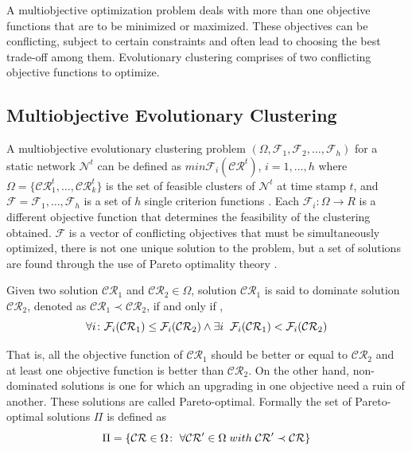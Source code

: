 \documentclass[12pt]{arsubmit}
\begin{document}
A multiobjective optimization problem deals with more than one objective functions that are to be minimized or maximized. These objectives can be conflicting, subject to certain constraints and often lead to choosing the best trade-off among them. Evolutionary clustering comprises of two conflicting objective functions to optimize.

\subsection{Multiobjective Evolutionary Clustering}

A multiobjective evolutionary clustering problem $(\Omega,\mathcal{F}_1,\mathcal{F}_2,\ldots,\mathcal{F}_h)$ for a static network $\mathcal{N}^t$ can be defined as $min \mathcal{F}_i(\mathcal{CR}^t)$, $i = 1,\ldots,h$ where $\Omega = \{\mathcal{CR}_1^t,\ldots,\mathcal{CR}_k^t\}$ is the set of feasible clusters of $\mathcal{N}^t$ at time stamp $t$, and $\mathcal{F} = {\mathcal{F}_1,\ldots,\mathcal{F}_h}$ is a set of $h$ single criterion functions \cite{dynmoga}. Each $\mathcal{F}_i\colon \Omega \rightarrow R$ is a different objective function that determines the feasibility of the clustering obtained. $\mathcal{F}$ is a vector of conflicting objectives that must be simultaneously optimized, there is not one unique solution to the problem, but a set of solutions are found through the use of Pareto optimality theory \cite{dynmoga9}. 

Given two solution $\mathcal{CR}_1$ and $\mathcal{CR}_2 \in \Omega$, solution $\mathcal{CR}_1$ is said to dominate solution $\mathcal{CR}_2$, denoted as $\mathcal{CR}_1 \prec \mathcal{CR}_2$, if and only if , \[\forall i \colon \mathcal{F}_i(\mathcal{CR}_1) \leq \mathcal{F}_i(\mathcal{CR}_2) \wedge \exists i\hspace {2 mm} \mathcal{F}_i(\mathcal{CR}_1)<\mathcal{F}_i(\mathcal{CR}_2)\]

That is, all the objective function of $\mathcal{CR}_1$ should be better or equal to $\mathcal{CR}_2$ and at least one objective function is better than $\mathcal{CR}_2$. On the other hand, non-dominated solutions is one for which an upgrading in one objective need a ruin of another. These solutions are called Pareto-optimal. Formally the set of Pareto-optimal solutions $\Pi$ is defined as \[\Pi = \{ \mathcal{CR} \in \Omega \colon \hspace {1 mm} \forall \mathcal{CR}' \in \Omega \hspace {1 mm}with \hspace {1 mm}\mathcal{CR}' \prec \mathcal{CR}\}\]
\end{document}
